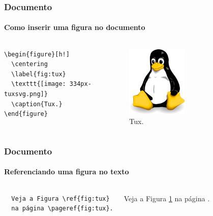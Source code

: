 \begin{frame}[fragile]
\frametitle{Documento}
\framesubtitle{Como inserir uma figura no documento}
  \scriptsize
  \begin{columns}[c]
  \begin{verbatim}
\begin{figure}[h!]
  \centering
  \label{fig:tux}
  \texttt{[image: 334px-tuxsvg.png]}
  \caption{Tux.}
\end{figure}
  \end{verbatim}
  \begin{fmpage}{\textwidth}
\begin{figure}[h!]
  \centering
  \label{fig:tux}
    \includegraphics[width=0.5\textwidth]{figures/334px-tuxsvg.png}
  \caption{Tux.}
\end{figure}
  \end{fmpage}
  \end{columns}
\end{frame}


\begin{frame}[fragile]
\frametitle{Documento}
\framesubtitle{Referenciando uma figura no texto}
  \scriptsize
  \begin{columns}[c]
  \begin{verbatim}
  Veja a Figura \ref{fig:tux} 
  na página \pageref{fig:tux}.
  \end{verbatim}
  \begin{fmpage}{\textwidth}
  Veja a Figura \ref{fig:tux} na página \pageref{fig:tux}.
  \end{fmpage}
  \end{columns}
\end{frame}


